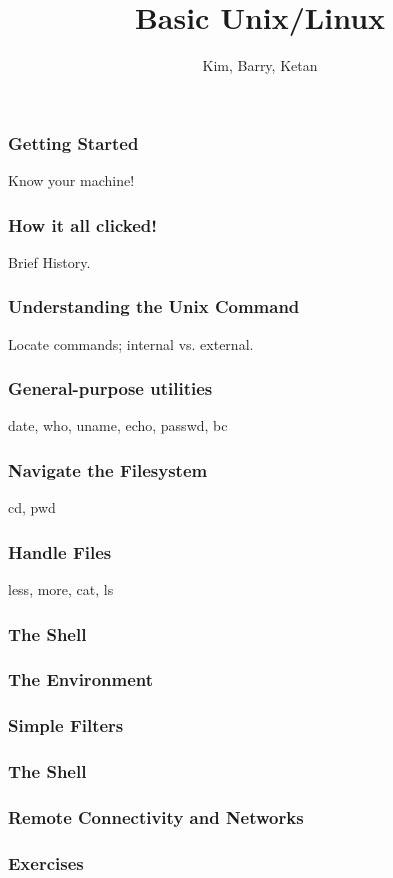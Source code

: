 \documentclass[hyperref={pdfpagelabels=false},12pt]{beamer}
\title[Basic Unix/Linux]{{Basic Unix/Linux}}
\author[Basic Unix/Linux]{{Kim, Barry, Ketan}}
\date{}
\begin{document}
\begin{frame}[plain]
\titlepage
\end{frame}

\begin{frame}
\frametitle{Getting Started}
Know your machine!
\end{frame}

\begin{frame}
\frametitle{How it all clicked!}
Brief History.
\end{frame}

\begin{frame}
\frametitle{Understanding the Unix Command}
Locate commands; internal vs. external.
\end{frame}

\begin{frame}
\frametitle{General-purpose utilities}
date, who, uname, echo, passwd, bc
\end{frame}

\begin{frame}
\frametitle{Navigate the Filesystem}
cd, pwd
\end{frame}

\begin{frame}
\frametitle{Handle Files}
less, more, cat, ls
\end{frame}

\begin{frame}
\frametitle{The Shell}
\end{frame}

\begin{frame}
\frametitle{The Environment}
\end{frame}

\begin{frame}
\frametitle{Simple Filters}
\end{frame}

\begin{frame}
\frametitle{The Shell}
\end{frame}

\begin{frame}
\frametitle{Remote Connectivity and Networks}
\end{frame}

\begin{frame}
\frametitle{Exercises}
\end{frame}
\end{document}
